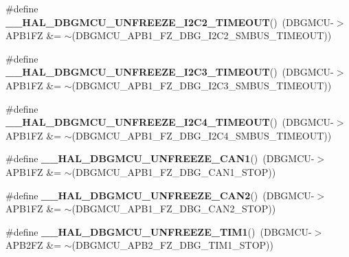 \begin{DoxyCompactItemize}
\#define {\bfseries \+\_\+\+\_\+\+H\+A\+L\+\_\+\+D\+B\+G\+M\+C\+U\+\_\+\+U\+N\+F\+R\+E\+E\+Z\+E\+\_\+\+I2\+C2\+\_\+\+T\+I\+M\+E\+O\+UT}()~(D\+B\+G\+M\+CU-\/$>$A\+P\+B1\+FZ \&= $\sim$(D\+B\+G\+M\+C\+U\+\_\+\+A\+P\+B1\+\_\+\+F\+Z\+\_\+\+D\+B\+G\+\_\+\+I2\+C2\+\_\+\+S\+M\+B\+U\+S\+\_\+\+T\+I\+M\+E\+O\+UT))
\item 
\mbox{\label{group___h_a_l___exported___macros_ga8beda05b7dc4962557f98a06e29326a4}} 
\#define {\bfseries \+\_\+\+\_\+\+H\+A\+L\+\_\+\+D\+B\+G\+M\+C\+U\+\_\+\+U\+N\+F\+R\+E\+E\+Z\+E\+\_\+\+I2\+C3\+\_\+\+T\+I\+M\+E\+O\+UT}()~(D\+B\+G\+M\+CU-\/$>$A\+P\+B1\+FZ \&= $\sim$(D\+B\+G\+M\+C\+U\+\_\+\+A\+P\+B1\+\_\+\+F\+Z\+\_\+\+D\+B\+G\+\_\+\+I2\+C3\+\_\+\+S\+M\+B\+U\+S\+\_\+\+T\+I\+M\+E\+O\+UT))
\item 
\mbox{\label{group___h_a_l___exported___macros_gadce4099c04903ce686de6b57d733fbbb}} 
\#define {\bfseries \+\_\+\+\_\+\+H\+A\+L\+\_\+\+D\+B\+G\+M\+C\+U\+\_\+\+U\+N\+F\+R\+E\+E\+Z\+E\+\_\+\+I2\+C4\+\_\+\+T\+I\+M\+E\+O\+UT}()~(D\+B\+G\+M\+CU-\/$>$A\+P\+B1\+FZ \&= $\sim$(D\+B\+G\+M\+C\+U\+\_\+\+A\+P\+B1\+\_\+\+F\+Z\+\_\+\+D\+B\+G\+\_\+\+I2\+C4\+\_\+\+S\+M\+B\+U\+S\+\_\+\+T\+I\+M\+E\+O\+UT))
\item 
\mbox{\label{group___h_a_l___exported___macros_gad580d0ec1c7b8eb8d5935e1fcbd58b07}} 
\#define {\bfseries \+\_\+\+\_\+\+H\+A\+L\+\_\+\+D\+B\+G\+M\+C\+U\+\_\+\+U\+N\+F\+R\+E\+E\+Z\+E\+\_\+\+C\+A\+N1}()~(D\+B\+G\+M\+CU-\/$>$A\+P\+B1\+FZ \&= $\sim$(D\+B\+G\+M\+C\+U\+\_\+\+A\+P\+B1\+\_\+\+F\+Z\+\_\+\+D\+B\+G\+\_\+\+C\+A\+N1\+\_\+\+S\+T\+OP))
\item 
\mbox{\label{group___h_a_l___exported___macros_ga10fd523f4709571f091465b8d58ad385}} 
\#define {\bfseries \+\_\+\+\_\+\+H\+A\+L\+\_\+\+D\+B\+G\+M\+C\+U\+\_\+\+U\+N\+F\+R\+E\+E\+Z\+E\+\_\+\+C\+A\+N2}()~(D\+B\+G\+M\+CU-\/$>$A\+P\+B1\+FZ \&= $\sim$(D\+B\+G\+M\+C\+U\+\_\+\+A\+P\+B1\+\_\+\+F\+Z\+\_\+\+D\+B\+G\+\_\+\+C\+A\+N2\+\_\+\+S\+T\+OP))
\item 
\mbox{\label{group___h_a_l___exported___macros_ga2f91eec9f9a424ab611be0e770c6692e}} 
\#define {\bfseries \+\_\+\+\_\+\+H\+A\+L\+\_\+\+D\+B\+G\+M\+C\+U\+\_\+\+U\+N\+F\+R\+E\+E\+Z\+E\+\_\+\+T\+I\+M1}()~(D\+B\+G\+M\+CU-\/$>$A\+P\+B2\+FZ \&= $\sim$(D\+B\+G\+M\+C\+U\+\_\+\+A\+P\+B2\+\_\+\+F\+Z\+\_\+\+D\+B\+G\+\_\+\+T\+I\+M1\+\_\+\+S\+T\+OP))

\end{DoxyCompactItemize}
